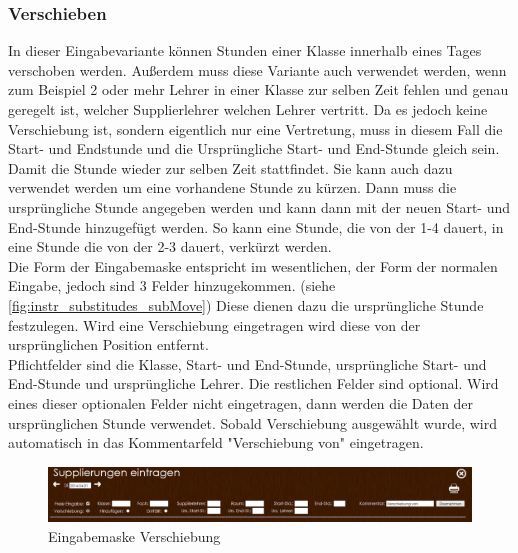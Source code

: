 \subsubsection{Verschieben}\label{sec:instr_admin_sub_move}
In dieser Eingabevariante können Stunden einer Klasse innerhalb eines Tages verschoben werden. Außerdem muss diese Variante auch verwendet werden, wenn zum Beispiel 2 oder mehr Lehrer in einer Klasse zur selben Zeit fehlen und genau geregelt ist, welcher Supplierlehrer welchen Lehrer vertritt. Da es jedoch keine Verschiebung ist, sondern eigentlich nur eine Vertretung, muss in diesem Fall die Start- und Endstunde und die Ursprüngliche Start- und End-Stunde gleich sein. Damit die Stunde wieder zur selben Zeit stattfindet. Sie kann auch dazu verwendet werden um eine vorhandene Stunde zu kürzen. Dann muss die ursprüngliche Stunde angegeben werden und kann dann mit der neuen Start- und End-Stunde hinzugefügt werden. So kann eine Stunde, die von der 1-4 dauert, in eine Stunde die von der 2-3 dauert, verkürzt werden.\\
Die Form der Eingabemaske entspricht im wesentlichen, der Form der normalen Eingabe, jedoch sind 3 Felder hinzugekommen. (siehe \autoref{fig:instr_substitudes_subMove}) Diese dienen dazu die ursprüngliche Stunde festzulegen. Wird eine Verschiebung eingetragen wird diese von der ursprünglichen Position entfernt.\\
Pflichtfelder sind die Klasse, Start- und End-Stunde, ursprüngliche Start- und End-Stunde und ursprüngliche Lehrer. Die restlichen Felder sind optional. Wird eines dieser optionalen Felder nicht eingetragen, dann werden die Daten der ursprünglichen Stunde verwendet. Sobald Verschiebung ausgewählt wurde, wird automatisch in das Kommentarfeld "Verschiebung von" eingetragen.
\begin{figure}[H]
\centering
\includegraphics[keepaspectratio=true, width=17cm]{images/screenshots/substitudes_move.png}
\caption{Eingabemaske Verschiebung}
\label{fig:instr_substitudes_subMove}
\end{figure}
